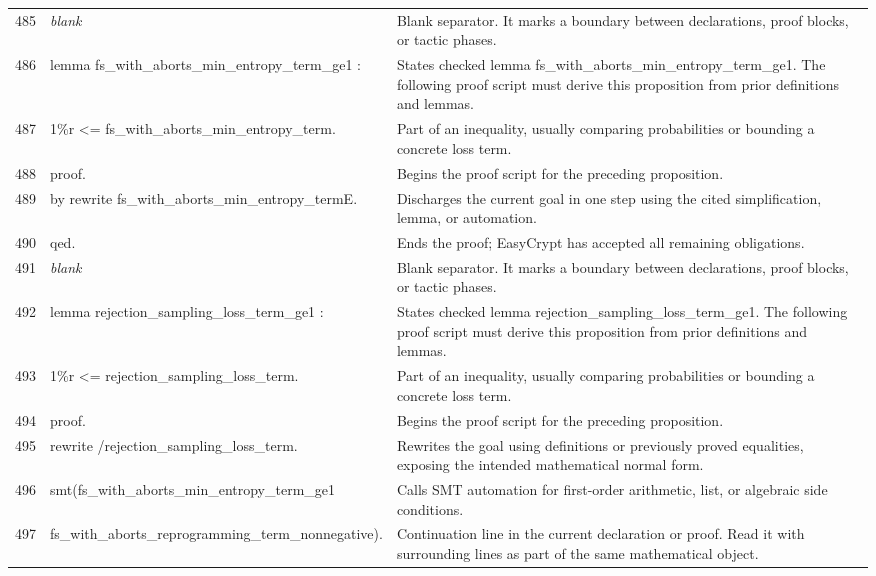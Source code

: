 \documentclass[10pt]{article}
\begin{document}
\begin{longtable}{r L{0.53\textwidth} L{0.37\textwidth}}
485 & {\ttfamily\scriptsize \emph{blank}} & Blank separator.  It marks a boundary between declarations, proof blocks, or tactic phases. \\
486 & {\ttfamily\scriptsize lemma fs\_with\_aborts\_min\_entropy\_term\_ge1 :} & States checked lemma fs\_with\_aborts\_min\_entropy\_term\_ge1.  The following proof script must derive this proposition from prior definitions and lemmas. \\
487 & {\ttfamily\scriptsize   1\%r <= fs\_with\_aborts\_min\_entropy\_term.} & Part of an inequality, usually comparing probabilities or bounding a concrete loss term. \\
488 & {\ttfamily\scriptsize proof.} & Begins the proof script for the preceding proposition. \\
489 & {\ttfamily\scriptsize by rewrite fs\_with\_aborts\_min\_entropy\_termE.} & Discharges the current goal in one step using the cited simplification, lemma, or automation. \\
490 & {\ttfamily\scriptsize qed.} & Ends the proof; EasyCrypt has accepted all remaining obligations. \\
491 & {\ttfamily\scriptsize \emph{blank}} & Blank separator.  It marks a boundary between declarations, proof blocks, or tactic phases. \\
492 & {\ttfamily\scriptsize lemma rejection\_sampling\_loss\_term\_ge1 :} & States checked lemma rejection\_sampling\_loss\_term\_ge1.  The following proof script must derive this proposition from prior definitions and lemmas. \\
493 & {\ttfamily\scriptsize   1\%r <= rejection\_sampling\_loss\_term.} & Part of an inequality, usually comparing probabilities or bounding a concrete loss term. \\
494 & {\ttfamily\scriptsize proof.} & Begins the proof script for the preceding proposition. \\
495 & {\ttfamily\scriptsize rewrite /rejection\_sampling\_loss\_term.} & Rewrites the goal using definitions or previously proved equalities, exposing the intended mathematical normal form. \\
496 & {\ttfamily\scriptsize smt(fs\_with\_aborts\_min\_entropy\_term\_ge1} & Calls SMT automation for first-order arithmetic, list, or algebraic side conditions. \\
497 & {\ttfamily\scriptsize     fs\_with\_aborts\_reprogramming\_term\_nonnegative).} & Continuation line in the current declaration or proof.  Read it with surrounding lines as part of the same mathematical object. \\

\end{longtable}
\end{document}
